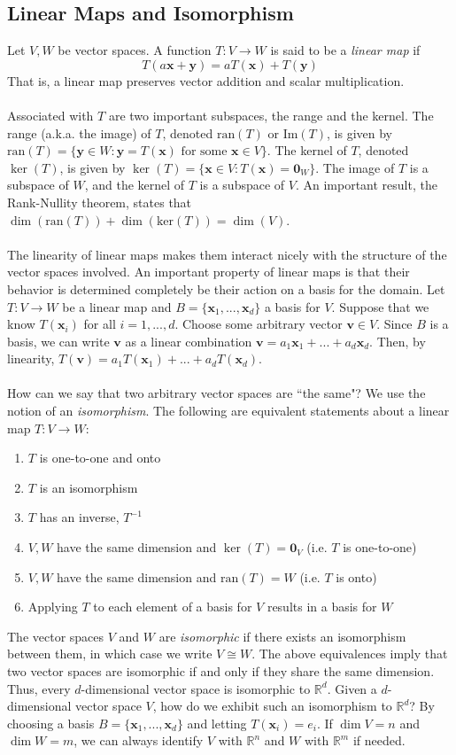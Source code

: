\documentclass{article}
\newcommand{\R}{\mathbb{R}}
\newcommand{\tit}{\textit}
\newcommand{\tbf}{\textbf}
\newcommand{\ran}{\text{ran}}
\begin{document}
\subsection{Linear Maps and Isomorphism}
Let $V,W$ be vector spaces. A function $T: V \to W$ is said to be a \tit{linear map} if 
$$T(a\tbf{x} + \tbf{y}) = aT(\tbf{x}) + T(\tbf{y})$$
That is, a linear map preserves vector addition and scalar multiplication.\\ \\
Associated with $T$ are two important subspaces, the range and the kernel. The range (a.k.a. the image) of $T$, denoted $\text{ran}(T)$ or $\text{Im}(T)$, is given by $\text{ran}(T) = \{ \tbf{y} \in W: \tbf{y} = T(\tbf{x}) \text{ for some } \tbf{x} \in V \}$. The kernel of $T$, denoted $\ker(T)$, is given by $\ker(T) = \{\tbf{x} \in V: T(\tbf{x}) = \tbf{0}_W\}$. The image of $T$ is a subspace of $W$, and the kernel of $T$ is a subspace of $V$. An important result, the Rank-Nullity theorem, states that $\dim(\text{ran}(T)) + \dim(\text{ker}(T)) = \dim(V)$.
\\ \\
The linearity of linear maps makes them interact nicely with the structure of the vector spaces involved. An important property of linear maps is that their behavior is determined completely be their action on a basis for the domain. Let $T: V \to W$ be a linear map and $B = \{\tbf{x}_1, ... , \tbf{x}_d\}$ a basis for $V$. Suppose that we know $T(\tbf{x}_i)$ for all $i = 1, ... , d$. Choose some arbitrary vector $\tbf{v} \in V$. Since $B$ is a basis, we can write $\tbf{v}$ as a linear combination $\tbf{v} = a_1\tbf{x}_1 + ... + a_d\tbf{x}_d$. Then, by linearity, $T(\tbf{v}) = a_1T(\tbf{x}_1) + ... + a_dT(\tbf{x}_d)$.
\\ \\
How can we say that two arbitrary vector spaces are ``the same"? We use the notion of an \tit{isomorphism}. The following are equivalent statements about a linear map $T: V \to W$:
\begin{enumerate}[label=(\roman*)]
\item $T$ is one-to-one and onto
\item $T$ is an isomorphism
\item $T$ has an inverse, $T^{-1}$ 
\item $V,W$ have the same dimension and $\ker(T) = \tbf{0}_V$ (i.e. $T$ is one-to-one)
\item $V,W$ have the same dimension and $\ran(T) = W$ (i.e. $T$ is onto)
\item Applying $T$ to each element of a basis for $V$ results in a basis for $W$
\end{enumerate}
The vector spaces $V$ and $W$ are \tit{isomorphic} if there exists an isomorphism between them, in which case we write $V \cong W$. The above equivalences imply that two vector spaces are isomorphic if and only if they share the same dimension. Thus, every $d$-dimensional vector space is isomorphic to $\R^d$. Given a $d$-dimensional vector space $V$, how do we exhibit such an isomorphism to $\R^d$? By choosing a basis $B = \{\tbf{x}_1, ... , \tbf{x}_d\}$ and letting $T(\tbf{x}_i) = e_i$. If $\dim V = n$ and $\dim W = m$, we can always identify $V$ with $\R^n$ and $W$ with $\R^m$ if needed. 
\end{document}
